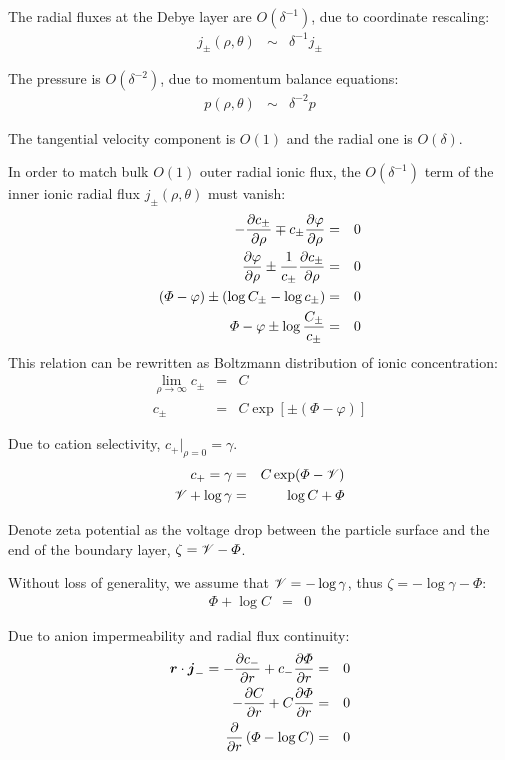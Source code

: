The radial fluxes at the Debye layer are $O(\delta^{-1})$, due to coordinate rescaling:
\begin{eqnarray}
  j_\pm(\rho, \theta) &\sim& \delta^{-1} j_\pm
\end{eqnarray}

The pressure is $O(\delta^{-2})$, due to momentum balance equations:
\begin{eqnarray}
  p(\rho, \theta) &\sim& \delta^{-2} p
\end{eqnarray}

The tangential velocity component is $O(1)$ and the radial one is $O(\delta)$.

In order to match bulk $O(1)$ outer radial ionic flux, 
the $O(\delta^{-1})$ term of the inner ionic radial flux $j_\pm(\rho, \theta)$ must vanish:
\begin{eqnarray}
  -\frac{\partial c_\pm}{\partial \rho} \mp c_\pm \frac{\partial \varphi}{\partial \rho} &=& 0 \\
  \frac{\partial \varphi}{\partial \rho} \pm\frac{1}{c_\pm}\frac{\partial c_\pm}{\partial \rho} &=& 0 \\
  \left(\varPhi - \varphi\right) \pm\left(\log C_\pm - \log c_\pm\right) &=& 0 \\
  \varPhi - \varphi \pm \log \frac{C_\pm}{c_\pm} &=& 0
\end{eqnarray}
This relation can be rewritten as Boltzmann distribution of ionic concentration:
\begin{eqnarray}
\lim_{\rho\rightarrow\infty} c_\pm &=& C \\
c_\pm &=& C \exp\left[\pm(\varPhi - \varphi)\right]
\end{eqnarray}

Due to cation selectivity, $c_+|_{\rho=0} = \gamma$.
\begin{eqnarray}
  c_+ = \gamma &=& C \exp(\varPhi - \mathscr{V}) \\
  \mathscr{V} + \log \gamma &=& \log C + \varPhi
\end{eqnarray}

Denote zeta potential as the voltage drop between the particle surface and the end of
the boundary layer, $\zeta = \mathscr{V} - \varPhi$. 

Without loss of generality, 
we assume that $\mathscr{V} = -\log\gamma$, thus $\zeta = -\log\gamma-\varPhi$:
\begin{eqnarray}
\varPhi + \log C &=& 0
\end{eqnarray}

Due to anion impermeability and radial flux continuity:
\begin{eqnarray}
  \boldsymbol{r} \cdot \boldsymbol{j}_- = -\frac{\partial c_-}{\partial r} + c_- \frac{\partial \varPhi}{\partial r} &=& 0 \\
-\frac{\partial C}{\partial r} + C \frac{\partial \varPhi}{\partial r} &=& 0 \\
\frac{\partial }{\partial r}\left(\varPhi - \log C\right) &=& 0
\end{eqnarray}

